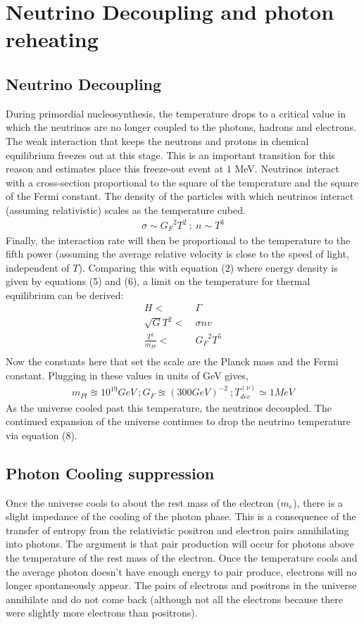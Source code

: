 \documentclass[12pt]{article}
\theoremstyle{plain}
\theoremstyle{definition}
\begin{document}
\section{Neutrino Decoupling and photon reheating}
\subsection{Neutrino Decoupling}
\hspace{0.2in} During primordial nucleosynthesis, the temperature drops to a critical value in which the neutrinos are no longer coupled to the photons, hadrons and electrons. The weak interaction that keeps the neutrons and protons in chemical equilibrium freezes out at this stage. This is an important transition for this reason and estimates place this freeze-out event at $1$ MeV. Neutrinos interact with a cross-section proportional to the square of the temperature and the square of the Fermi constant. The density of the particles with which neutrinos interact (assuming relativistic) scales as the temperature cubed. 
\begin{align*}
\sigma\sim{G_F}^2{T^2} \ ; \ n\sim{T^3}
\end{align*}
Finally, the interaction rate will then be proportional to the temperature to the fifth power (assuming the average relative velocity is close to the speed of light, independent of $T$). Comparing this with equation (2) where energy density is given by equations (5) and (6), a limit on the temperature for thermal equilibrium can be derived:
\begin{align*}
H <& \ \Gamma \\
\sqrt{G} T^2 <& \ \sigma n v \\
\frac{T^2}{m_{Pl}} <& \ {G_F}^2{T^5}\\
\end{align*}
Now the constants here that set the scale are the Planck mass and the Fermi constant. Plugging in these values in units of GeV gives,
\begin{align*}
m_{Pl}\approxeq 10^{19} GeV \ ; G_{F}\approxeq(300 GeV)^{-2} \ ; T^{\left(\nu\right)}_{dec}\simeq 1 MeV
\end{align*}
As the universe cooled past this temperature, the neutrinos decoupled. The continued expansion of the universe continues to drop the neutrino temperature via equation (8).
\subsection{Photon Cooling suppression}
\hspace{0.2in} Once the universe cools to about the rest mass of the electron ($m_e$), there is a slight impedance of the cooling of the photon phase. This is a consequence of the transfer of entropy from the relativistic positron and electron pairs annihilating into photons. The argument is that pair production will occur for photons above the temperature of the rest mass of the electron. Once the temperature cools and the average photon doesn't have enough energy to pair produce, electrons will no longer spontaneously appear. The pairs of electrons and positrons in the universe annihilate and do not come back (although not all the electrons because there were slightly more electrons than positrons).
\end{document}
